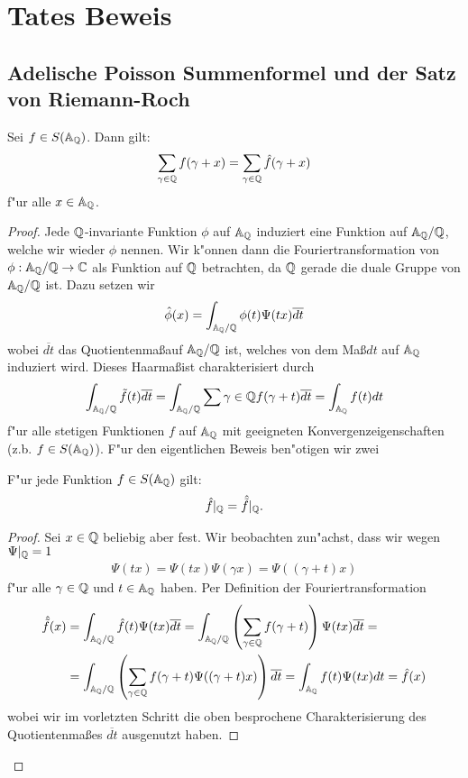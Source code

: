 \section{Tates Beweis}
\subsection{Adelische Poisson Summenformel und der Satz von Riemann-Roch}
	\begin{satz}\label{satz:adelic-poisson}
		Sei $f \in S(\mathbb{A}_{\mathbb{Q}})$. Dann gilt:
		\begin{align}
			\sum_{\gamma \in \mathbb{Q}} {f(\gamma + x)} = \sum_{\gamma \in \mathbb{Q}}{\hat{f}(\gamma + x)}
		\end{align}
		f"ur alle $x \in \mathbb{A}_{\mathbb{Q}}$.
	\end{satz}
	\begin{proof}
		Jede $\mathbb{Q}$-invariante Funktion $\phi$ auf $\mathbb{A}_{\mathbb{Q}}$ induziert eine Funktion auf $\mathbb{A}_{\mathbb{Q}}/\mathbb{Q}$, welche wir wieder $\phi$ nennen.
		Wir k"onnen dann die Fouriertransformation von $\phi: \mathbb{A}_{\mathbb{Q}}/\mathbb{Q} \rightarrow \mathbb{C}$ als Funktion auf $\mathbb{Q}$ betrachten, da $\mathbb{Q}$ gerade die duale Gruppe von $\mathbb{A}_{\mathbb{Q}}/\mathbb{Q}$ ist. Dazu setzen wir
		\begin{align*}
			\hat{\phi}(x) = \int_{\mathbb{A}_{\mathbb{Q}}/\mathbb{Q}}\phi(t)\Psi(tx)\overline{dt}
		\end{align*}
		wobei $\overline{dt}$ das Quotientenma\ss auf $\mathbb{A}_{\mathbb{Q}}/\mathbb{Q}$ ist, welches von dem Ma\ss $dt$ auf $\mathbb{A}_{\mathbb{Q}}$ induziert wird. Dieses Haarma\ss ist charakterisiert durch
		\begin{align*}
			\int_{\mathbb{A}_{\mathbb{Q}}/\mathbb{Q}}\tilde{f}(t)\overline{dt} =
			\int_{\mathbb{A}_{\mathbb{Q}}/\mathbb{Q}}\sum{\gamma \in \mathbb{Q}}f(\gamma+t)\overline{dt} =
			\int_{\mathbb{A}_{\mathbb{Q}}} f(t)dt
		\end{align*}
		f"ur alle stetigen Funktionen $f$ auf $\mathbb{A}_{\mathbb{Q}}$ mit geeigneten Konvergenzeigenschaften (z.b. $f\in S(\mathbb{A}_{\mathbb{Q}})$). F"ur den eigentlichen Beweis ben"otigen wir zwei
		
		\begin{lemma}
			F"ur jede Funktion $f \in S(\mathbb{A}_{\mathbb{Q}})$ gilt:
			\begin{align*}
				\hat{f}|_{\mathbb{Q}} = \hat{\tilde{f}}|_{\mathbb{Q}}.
			\end{align*}
		\end{lemma}
		\begin{proof}
			Sei $x \in \mathbb{Q}$ beliebig aber fest. Wir beobachten zun"achst, dass wir wegen $\Psi|_{\mathbb{Q}} =1$
			\begin{align*}
				\Psi(tx)= \Psi(tx)\Psi(\gamma x)=\Psi((\gamma + t) x)
			\end{align*}
			f"ur alle $\gamma \in \mathbb{Q}$ und $t\in \mathbb{A}_{\mathbb{Q}}$ haben. Per Definition der Fouriertransformation
			\begin{align*}
				\hat{\tilde{f}}(x)	&= \int_{\mathbb{A}_{\mathbb{Q}} / \mathbb{Q}} {\hat{f}(t)\Psi(tx)\overline{dt}} 
									 = \int_{\mathbb{A}_{\mathbb{Q}} / \mathbb{Q}} \left(\sum_{\gamma \in \mathbb{Q}}{f(\gamma + t)}\right)\Psi(tx)\overline{dt} =\\
									&= \int_{\mathbb{A}_{\mathbb{Q}} / \mathbb{Q}} \left(\sum_{\gamma \in \mathbb{Q}}{f(\gamma + t)}\Psi((\gamma + t)x)\right)\overline{dt}
									 = \int_{\mathbb{A}_{\mathbb{Q}}} f(t)\Psi(tx)dt = \hat{f}(x)
			\end{align*}
			wobei wir im vorletzten Schritt die oben besprochene Charakterisierung des Quotientenmaßes $\overline{dt}$ ausgenutzt haben.
		\end{proof}
		

\end{proof}
